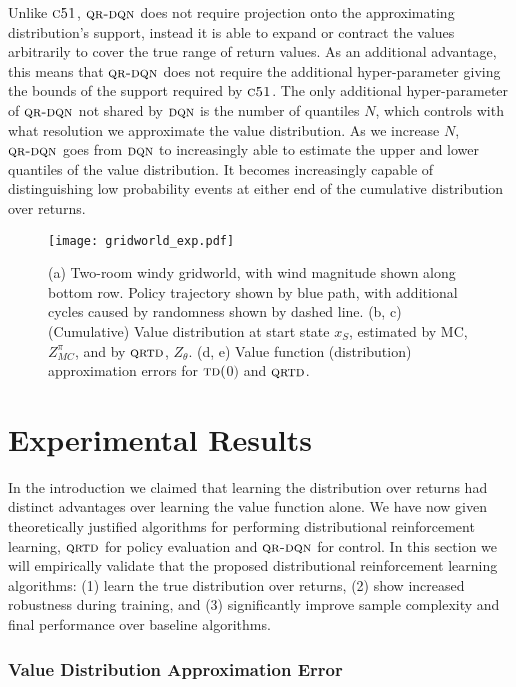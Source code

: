 \documentclass[letterpaper]{article}
\def \cfo {\textsc{c51}}
\def \dqn {\textsc{dqn}}
\def \td {\textsc{td}($0$)}
\def \qrtd {\textsc{qrtd}}
\def \qrdqn {\textsc{qr-dqn}}
\begin{document}
Unlike $\cfo$, $\qrdqn$ does not require projection onto the approximating distribution's support, instead it is able to expand or contract the values arbitrarily to cover the true range of return values. As an additional advantage, this means that $\qrdqn$ does not require the additional hyper-parameter giving the bounds of the support required by $\cfo$. The only additional hyper-parameter of $\qrdqn$ not shared by $\dqn$ is the number of quantiles $N$, which controls with what resolution we approximate the value distribution. As we increase $N$, $\qrdqn$ goes from $\dqn$ to increasingly able to estimate the upper and lower quantiles of the value distribution. It becomes increasingly capable of distinguishing low probability events at either end of the cumulative distribution over returns. 

\begin{figure*}[ht]
\begin{center}
\texttt{[image: gridworld\_exp.pdf]}
\end{center}
\caption{(a) Two-room windy gridworld, with wind magnitude shown along bottom row. Policy trajectory shown by blue path, with additional cycles caused by randomness shown by dashed line. (b, c) (Cumulative) Value distribution at start state $x_S$, estimated by MC, $Z^\pi_{MC}$, and by $\qrtd$, $Z_\theta$. (d, e) Value function (distribution) approximation errors for $\td$ and $\qrtd$. \label{fig:windy_gw}}
\end{figure*}

\section{Experimental Results}

In the introduction we claimed that learning the distribution over returns had distinct advantages over learning the value function alone. We have now given theoretically justified algorithms for performing distributional reinforcement learning, $\qrtd$ for policy evaluation and $\qrdqn$ for control. In this section we will empirically validate that the proposed distributional reinforcement learning algorithms: (1) learn the true distribution over returns, (2) show increased robustness during training, and (3) significantly improve sample complexity and final performance over baseline algorithms.

\subsubsection{Value Distribution Approximation Error}
\end{document}
